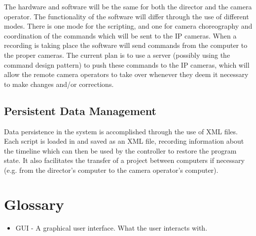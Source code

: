 \documentclass[11pt,twoside,a4paper]{article}
\begin{document}
The hardware and software will be the same for both the director and the camera operator. The functionality of the software will differ through the use of different modes. There is one mode for the scripting, and one for camera choreography and coordination of the commands which will be sent to the IP cameras. When a recording is taking place the software will send commands from the computer to the proper cameras. The current plan is to use a server (possibly using the command design pattern) to push these commands to the IP cameras, which will allow the remote camera operators to take over whenever they deem it necessary to make changes and/or corrections.

\subsection{Persistent Data Management}
Data persistence in the system is accomplished through the use of XML files. Each script is loaded in and saved as an XML file, recording information about the timeline which can then be used by the controller to restore the program state. It also facilitates the transfer of a project between computers if necessary (e.g. from the director's computer to the camera operator's computer).

\section{Glossary}
\begin{itemize}
  \item GUI - A graphical user interface. What the user interacts with.
\end{itemize}
\end{document}
